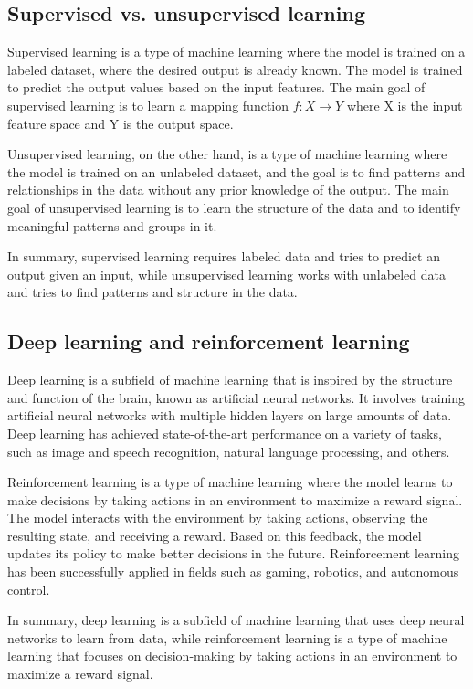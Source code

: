 \documentclass[12pt, a4paper, oneside]{article}
\begin{document}
\subsection{ Supervised vs. unsupervised learning }
Supervised learning is a type of machine learning where the model is trained on a labeled dataset, where the desired output is already known. The model is trained to predict the output values based on the input features. The main goal of supervised learning is to learn a mapping function $f: X \rightarrow Y$ where X is the input feature space and Y is the output space.

Unsupervised learning, on the other hand, is a type of machine learning where the model is trained on an unlabeled dataset, and the goal is to find patterns and relationships in the data without any prior knowledge of the output. The main goal of unsupervised learning is to learn the structure of the data and to identify meaningful patterns and groups in it.

In summary, supervised learning requires labeled data and tries to predict an output given an input, while unsupervised learning works with unlabeled data and tries to find patterns and structure in the data.
\subsection{ Deep learning and reinforcement learning }
Deep learning is a subfield of machine learning that is inspired by the structure and function of the brain, known as artificial neural networks. It involves training artificial neural networks with multiple hidden layers on large amounts of data. Deep learning has achieved state-of-the-art performance on a variety of tasks, such as image and speech recognition, natural language processing, and others.

Reinforcement learning is a type of machine learning where the model learns to make decisions by taking actions in an environment to maximize a reward signal. The model interacts with the environment by taking actions, observing the resulting state, and receiving a reward. Based on this feedback, the model updates its policy to make better decisions in the future. Reinforcement learning has been successfully applied in fields such as gaming, robotics, and autonomous control.

In summary, deep learning is a subfield of machine learning that uses deep neural networks to learn from data, while reinforcement learning is a type of machine learning that focuses on decision-making by taking actions in an environment to maximize a reward signal.
\end{document}
